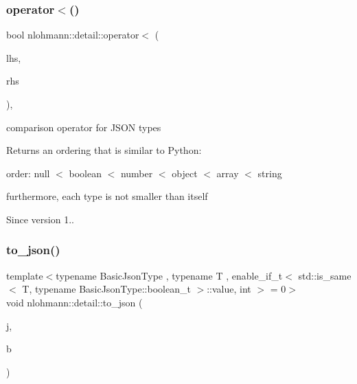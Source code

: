 \mbox{\label{namespacenlohmann_1_1detail_a09169efff3bd1771fff29bd92cea19e0}} 
\subsubsection{\texorpdfstring{operator$<$()}{operator<()}}
{\footnotesize\ttfamily bool nlohmann\+::detail\+::operator$<$ (\begin{DoxyParamCaption}\item[{const \mbox{\hyperlink{namespacenlohmann_1_1detail_a90aa5ef615aa8305e9ea20d8a947980f}{value\+\_\+t}}}]{lhs,  }\item[{const \mbox{\hyperlink{namespacenlohmann_1_1detail_a90aa5ef615aa8305e9ea20d8a947980f}{value\+\_\+t}}}]{rhs }\end{DoxyParamCaption})\hspace{0.3cm}{\ttfamily [inline]}, {\ttfamily [noexcept]}}



comparison operator for J\+S\+ON types 

Returns an ordering that is similar to Python\+:
\begin{DoxyItemize}
\item order\+: null $<$ boolean $<$ number $<$ object $<$ array $<$ string
\item furthermore, each type is not smaller than itself
\end{DoxyItemize}

\begin{DoxySince}{Since}
version 1.. 
\end{DoxySince}
\mbox{\label{namespacenlohmann_1_1detail_a1a804b98cbe89b7e44b698f2ca860490}} 
\subsubsection{\texorpdfstring{to\_json()}{to\_json()}\hspace{0.1cm}{\footnotesize\ttfamily [1/8]}}
{\footnotesize\ttfamily template$<$typename Basic\+Json\+Type , typename T , enable\+\_\+if\+\_\+t$<$ std\+::is\+\_\+same$<$ T, typename Basic\+Json\+Type\+::boolean\+\_\+t $>$\+::value, int $>$  = 0$>$ \\
void nlohmann\+::detail\+::to\+\_\+json (\begin{DoxyParamCaption}\item[{Basic\+Json\+Type \&}]{j,  }\item[{T}]{b }\end{DoxyParamCaption})\hspace{0.3cm}{\ttfamily [noexcept]}}

